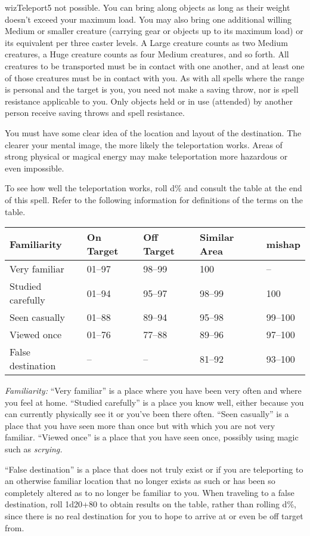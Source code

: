 \begin{spellcard}{wiz}{Teleport}{5}
  not possible. You can bring along objects as long as their weight
  doesn't exceed your maximum load. You may also bring one additional
  willing Medium or smaller creature (carrying gear or objects up to its
  maximum load) or its equivalent per three caster levels. A Large
  creature counts as two Medium creatures, a Huge creature counts as four
  Medium creatures, and so forth. All creatures to be transported must be
  in contact with one another, and at least one of those creatures must be
  in contact with you. As with all spells where the range is personal and
  the target is you, you need not make a saving throw, nor is spell
  resistance applicable to you. Only objects held or in use (attended) by
  another person receive saving throws and spell resistance.

  You must have some clear idea of the location and layout of the
  destination. The clearer your mental image, the more likely the
  teleportation works. Areas of strong physical or magical energy may make
  teleportation more hazardous or even impossible.

  To see how well the teleportation works, roll d\% and consult the table
  at the end of this spell. Refer to the following information for
  definitions of the terms on the table.

  \begin{longtable}[]{@{}lllll@{}}
    \toprule
    Familiarity       & On Target & Off Target & Similar Area & mishap \tabularnewline\midrule
    \endhead{}
    Very familiar     & 01--97    & 98--99     & 100          & --\tabularnewline{}
    Studied carefully & 01--94    & 95--97     & 98--99       & 100\tabularnewline{}
    Seen casually     & 01--88    & 89--94     & 95--98       & 99--100\tabularnewline{}
    Viewed once       & 01--76    & 77--88     & 89--96       & 97--100\tabularnewline{}
    False destination & --        & --         & 81--92       & 93--100\tabularnewline\bottomrule
  \end{longtable}

  \emph{Familiarity:} ``Very familiar'' is a place where you have been very
  often and where you feel at home. ``Studied carefully'' is a place you
  know well, either because you can currently physically see it or you've
  been there often. ``Seen casually'' is a place that you have seen more
  than once but with which you are not very familiar. ``Viewed once'' is a
  place that you have seen once, possibly using magic such as
  \emph{scrying.}

  ``False destination'' is a place that does not truly exist or if you are
  teleporting to an otherwise familiar location that no longer exists as
  such or has been so completely altered as to no longer be familiar to
  you. When traveling to a false destination, roll 1d20+80 to obtain
  results on the table, rather than rolling d\%, since there is no real
  destination for you to hope to arrive at or even be off target from.


\end{spellcard}
